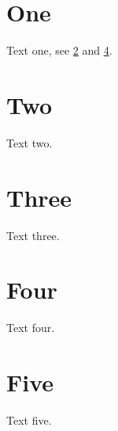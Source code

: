 \documentclass{article}
\begin{document}
\section{One}\label{dup}
Text one, see \ref{dup/} and \ref{x}.
\section{Two}\label{dup/}
Text two.
\section{Three}\label{./x}
Text three.
\section{Four}\label{x}
Text four.
\section{Five}\label{index}
Text five.
\end{document}
